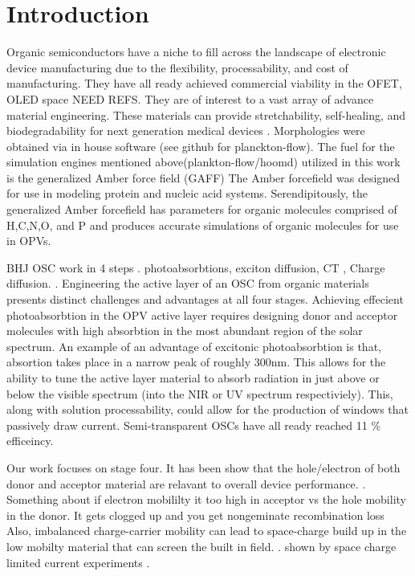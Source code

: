 \chapter{Introduction} 
\indent Organic semiconductors have a niche to fill across the landscape of electronic
device manufacturing due to the flexibility, processability, and cost of manufacturing. They have all ready
achieved commercial viability in the OFET, OLED space NEED REFS. They are of interest to a vast array of
advance material engineering. These materials can
provide stretchability, self-healing, and biodegradability for next generation medical devices
\cite{Brutting2006}.  Morphologies were obtained via in house software (see github for planckton-flow).  The
fuel for the simulation engines mentioned above(plankton-flow/hoomd) utilized in this work is the generalized
Amber force field (GAFF)\cite{Wang2004a} The Amber forcefield was designed for use in modeling protein and
nucleic acid systems.  Serendipitously, the generalized Amber forcefield has parameters for organic molecules
comprised of H,C,N,O, and P and produces accurate simulations of organic molecules for use in OPVs.  

BHJ OSC work in 4 steps . photoabsorbtions, exciton diffusion, CT , Charge diffusion. \citet{Fusella2019}.
Engineering the active layer of an OSC from organic materials presents distinct challenges and advantages at
all four stages. Achieving effecient photoabsorbtion in the OPV active layer requires designing donor and
acceptor molecules with high absorbtion in the most abundant region of the solar spectrum. An example
of an advantage of excitonic photoabsorbtion is that, absortion takes place in a narrow peak of roughly 300nm.
This allows for the ability to tune the active layer material to absorb radiation in just above or below the
visible spectrum (into the NIR or UV spectrum respectiviely). This, along with solution processability, 
could allow for the production of windows that passively draw current. Semi-transparent OSCs have all ready
reached 11 \% efficeincy. \cite{Brabec2020}

\newline \indent Our work
focuses on stage four. It has been show that the hole/electron of both donor and acceptor material are
relavant to overall device performance. \cite{Wang2019e}.  Something about if electron mobililty it too high
in acceptor vs the hole mobility in the donor. It gets clogged up and you get nongeminate recombination loss
Also, imbalanced charge-carrier mobility can lead to space-charge build up in the low mobilty material that
can screen the built in field.  \cite{Bartelt2015}. shown by space charge limited current experiments
\cite{Small2013}.

